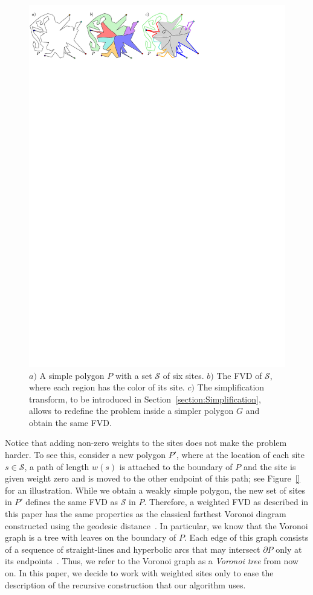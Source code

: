 \documentclass[a4paper,UKenglish]{socg-lipics-v2018}
\newcommand{\s}{\mathcal S}
\begin{document}
\begin{figure}[t]
\centering
\includegraphics{Simplification.pdf}
\caption{$a)$ A simple polygon $P$ with a set $\s$ of six sites. $b)$ The FVD of $\s$, where each region has the color of its site.
$c)$ The simplification transform, to be introduced in Section~\ref{section:Simplification}, allows to redefine the problem inside a simpler polygon $G$ and obtain the same FVD.}
\label{fig:FVD}
\end{figure}

Notice that adding non-zero weights to the sites does not make the problem harder. 
To see this, consider a new polygon $P'$, where at the location of each site $s\in \s$, a path of length $w(s)$ is attached to the boundary of $P$ and the site is given weight zero and is moved to the other endpoint of this path; see Figure~\ref{} for an illustration. 
While we obtain a weakly simple polygon, the new set of sites in $P'$ defines the same FVD as $\s$ in $P$. 
Therefore, a weighted FVD as described in this paper has the same properties as the classical farthest Voronoi diagram constructed using the geodesic distance~\cite{aronov1993furthest}. 
In particular, we know that the Voronoi graph is a tree with leaves on the boundary of $P$.
Each edge of this graph consists of a sequence of straight-lines and hyperbolic arcs that may intersect $\partial P$ only at its endpoints~\cite{aronov1993furthest}. Thus, we refer to the Voronoi graph as a \emph{Voronoi tree} from now on.
In this paper, we decide to work with weighted sites only to ease the description of the recursive construction that our algorithm uses. 
\end{document}
